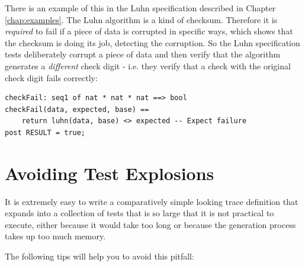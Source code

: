 \documentclass{overturerepchap}
\begin{document}
There is an example of this in the Luhn specification described in Chapter
\ref{chap:examples}. The Luhn algorithm is a kind of checksum. Therefore it is
\emph{required} to fail if a piece of data is corrupted in specific ways, which
shows that the checksum is doing its job, detecting the corruption. So the Luhn
specification tests deliberately corrupt a piece of data and then verify that
the algorithm generates a \emph{different} check digit - i.e. they verify that a
check with the original check digit fails correctly:

\small
\begin{lstlisting}
checkFail: seq1 of nat * nat * nat ==> bool
checkFail(data, expected, base) ==
	return luhn(data, base) <> expected	-- Expect failure
post RESULT = true;
\end{lstlisting}
\normalsize

\section{Avoiding Test Explosions}

It is extremely easy to write a comparatively simple looking trace definition
that expands into a collection of tests that is so large that it is not
practical to execute, either because it would take too long or because the
generation process takes up too much memory.

The following tips will help you to avoid this pitfall:
\end{document}
